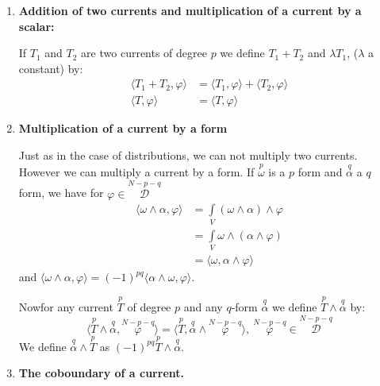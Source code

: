 \begin{enumerate}
\renewcommand{\labelenumi}{\theenumi)}
\item {\bf Addition of two currents and multiplication of a current by
  a scalar:}

If $T_{1}$ and $T_{2}$ are two currents of degree $p$ we define
$T_{1}+T_{2}$ and $\lambda T_{1}$, ($\lambda$ a constant) by:
\begin{align*}
\langle T_{1}+T_{2},\varphi\rangle &= \langle T_{1},\varphi\rangle
+\langle T_{2},\varphi\rangle\\
\langle T,\varphi\rangle &= \langle T,\varphi\rangle
\end{align*}

\item {\bf Multiplication of a current by a form}

Just as in the case of distributions, we can not multiply two
currents. However we can multiply a current by a form. If
$\overset{p}{\omega}$ is a $p$ form and $\overset{q}{\alpha}$ a $q$
form, we have for $\varphi\in \overset{N-p-q}{\mathscr{D}}$
\begin{align*}
\langle\omega \wedge\alpha,\varphi\rangle &=
\int\limits_{V}(\omega\wedge\alpha)\wedge\varphi\\
&=\int\limits_{V}\omega\wedge (\alpha\wedge\varphi)\\
&=\langle \omega,\alpha\wedge \varphi\rangle
\end{align*}
and $\langle
\omega\wedge\alpha,\varphi\rangle=(-1)^{pq}\langle\alpha\wedge\omega,\varphi\rangle$. 

Now\pageoriginale for any current $\overset{p}{T}$ of degree $p$ and
any $q$-form $\overset{q}{\alpha}$ we define $\overset{p}{T}\wedge
\overset{q}{\alpha}$ by:
$$
\langle
\overset{p}{T}\wedge\overset{q}{\alpha},\overset{N-p-q}{\varphi}\rangle=\langle
\overset{p}{T},\overset{q}{\alpha}\wedge
\overset{N-p-q}{\varphi}\rangle,~
\overset{N-p-q}{\varphi}\in\overset{N-p-q}{\mathscr{D}} 
$$
We define $\overset{q}{\alpha}\wedge \overset{p}{T}$ as
$(-1)^{pq}\overset{p}{T}\wedge\overset{q}{\alpha}$. 

\item {\bf The coboundary of a current.}


\end{enumerate}
